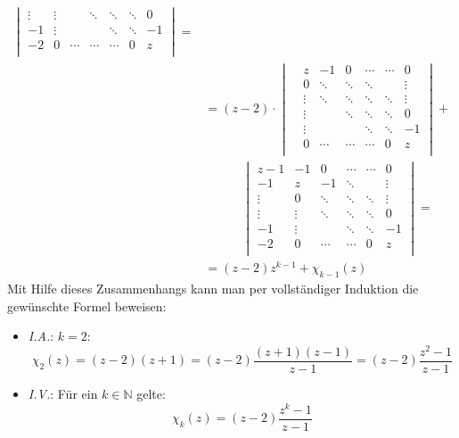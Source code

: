 \begin{flushenum}
\begin{equation*}
\begin{split}
\begin{vmatrix}
					\vdots & \vdots &        & \ddots & \ddots & \ddots & 0      \\
					-1     & \vdots &        &        & \ddots & \ddots & -1     \\
					-2     & 0      & \cdots & \cdots & \cdots & 0      & z      \\
				\end{vmatrix} = \\
			& = (z-2) \cdot
				\begin{vmatrix}
					& z      & -1     & 0      & \cdots & \cdots & 0      \\
					& 0      & \ddots & \ddots & \ddots &        & \vdots \\
					& \vdots & \ddots & \ddots & \ddots & \ddots & \vdots \\
					& \vdots &        & \ddots & \ddots & \ddots & 0      \\
					& \vdots &        &        & \ddots & \ddots & -1     \\
					& 0      & \cdots & \cdots & \cdots & 0      & z      \\
				\end{vmatrix} + \\
				& \quad \quad \quad
				\begin{vmatrix}
					z-1    & -1     & 0      & \cdots & \cdots & 0      \\
					-1     & z      & -1     & \ddots &        & \vdots \\
					\vdots & 0      & \ddots & \ddots & \ddots & \vdots \\
					\vdots & \vdots & \ddots & \ddots & \ddots & 0      \\
					-1     & \vdots &        & \ddots & \ddots & -1     \\
					-2     & 0      & \cdots & \cdots & 0      & z      \\
				\end{vmatrix} = \\
			&= (z-2) z^{k-1} + \chi_{k-1}(z)
	\end{split}
	\end{equation*}
	Mit Hilfe dieses Zusammenhangs kann man per vollständiger Induktion die gewünschte Formel beweisen:
	\begin{itemize}
		\item \textit{I.A.}: $k=2$: \[ \chi_2(z) = (z-2)(z+1) = (z-2)\frac{(z+1)(z-1)}{z-1} = (z-2)\frac{z^2 - 1}{z-1} \]
		\item \textit{I.V.}: Für ein $k \in \mathbb{N}$ gelte:
			\[ \chi_k(z) = (z-2)\frac{z^k - 1}{z-1} \]

\end{itemize}
\end{flushenum}
